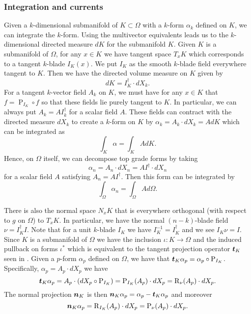 \subsubsection{Integration and currents}
\label{subsubsec:integration_on_submanifolds}
Given a $k$-dimensional submanifold of $K \subset \Omega$ with a $k$-form $\alpha_k$ defined on $K$, we can integrate the $k$-form. Using the multivector equivalents leads us to the $k$-dimensional directed measure $dK$ for the submanifold $K$.  Given $K$ is a submanifold of $\Omega$, for any $x \in K$ we have tangent space $T_x K$ which corresponds to a tangent $k$-blade $I_K(x)$.  We put $I_K$ as the smooth $k$-blade field everywhere tangent to $K$. Then we have the directed volume measure on $K$ given by
\[
dK = I_K^\dagger \cdot dX_k.
\]
For a tangent $k$-vector field $A_k$ on $K$, we must have for any $x \in K$ that $f = \operatorname{P}_{I_K} \circ f$ so that these fields lie purely tangent to $K$. In particular, we can always put $A_k = A I_k^\dagger$ for a scalar field $A$. These fields can contract with the directed measure $dX_k$ to create a $k$-form on $K$ by $\alpha_k = A_k \cdot dX_k = A dK$ which can be integrated as
\[
\int_K \alpha = \int_K A dK.
\]
Hence, on $\Omega$ itself, we can decompose top grade forms by taking
\[
\alpha_n = A_n \cdot dX_n = A I^\dagger \cdot dX_n
\]
for a scalar field $A$ satisfying $A_n = AI^\dagger$. Then this form can be integrated by
\[
\int_\Omega \alpha_n = \int_\Omega A d\Omega.
\]

There is also the normal space $N_x K$ that is everywhere orthogonal (with respect to $g$ on $\Omega$) to $T_x K$.  In particular, we have the normal $(n-k)$-blade field $\nu = I_K^\dagger I$. Note that for a unit $k$-blade $I_K$ we have $I_K^{-1}=I_K^\dagger$ and we see $I_K \nu = I$. Since $K$ is a submanifold of $\Omega$ we have the inclusion $\iota \colon K \to \Omega$ and the induced pullback on forms $\iota^*$ which is equivalent to the tangent projection operator $\boldsymbol{t}_K$ seen in \cite{schwarz_hodge_1995}. Given a $p$-form $\alpha_p$ defined on $\Omega$, we have that $\boldsymbol{t}_K \alpha_p = \alpha_p \circ \operatorname{P}_{I_K}$. Specifically, $\alpha_p = A_p \cdot dX_p$ we have 
\[
\boldsymbol{t}_K \alpha_p  = A_p \cdot (dX_p \circ \operatorname{P}_{I_K}) = \operatorname{P}_{I_K}(A_p) \cdot dX_p = \operatorname{R}_{\nu}(A_p)\cdot dX_p.
\]
The normal projection $\boldsymbol{n}_K$ is then $\boldsymbol{n}_K \alpha_p = \alpha_p - \boldsymbol{t}_K \alpha_p$ and moreover
\[
\boldsymbol{n}_K \alpha_p = \operatorname{R}_{I_K}(A_p)\cdot dX_p = \operatorname{P}_{\nu}(A_p)\cdot dX_p.
\]

